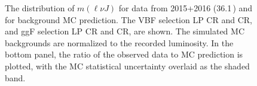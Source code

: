 \begin{figure}[htbp]
\caption[Data and Monte Carlo comparison in the low purity control regions]{The distribution of $m(\ell\nu J)$ for data from 2015+2016 (36.1\,\ifb) and for background MC prediction. The VBF selection LP \protect{} \Wjets CR and \protect{} \ttbar CR, and ggF selection LP \protect{} \Wjets CR and \protect{} \ttbar CR, are shown. The simulated MC backgrounds are normalized to the recorded luminosity. In the bottom panel, the ratio of the observed data to MC prediction is plotted, with the MC statistical uncertainty overlaid as the shaded band.}
\label{fig:datamc_lpcr}
\end{figure}


